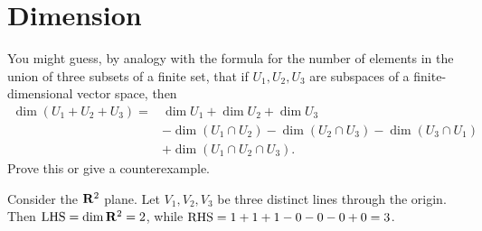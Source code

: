 \section{Dimension}

\begin{exercise}{17}
	You might guess, by analogy with the formula for the number of elements in the union of three subsets of a finite set, that if \( U_{1}, U_{2}, U_{3} \) are subspaces of a finite-dimensional vector space, then
	\begin{align*}
		\dim(U_{1} + U_{2} + U_{3}) =& \dim{U_{1}} + \dim{U_{2}} + \dim{U_{3}} \\
		                             &- \dim(U_{1} \cap U_{2}) - \dim(U_{2} \cap U_{3}) - \dim(U_{3} \cap U_{1}) \\
																 &+ \dim(U_{1} \cap U_{2} \cap U_{3}).
	\end{align*}
	Prove this or give a counterexample.
\end{exercise}

\begin{countexam}
	Consider the \( \mathbf{R}^{2} \) plane. Let \( V_{1}, V_{2}, V_{3} \) be three distinct lines through the origin. Then \( \mathrm{LHS} = \dim{\mathbf{R}^{2}} = 2 \), while \( \mathrm{RHS} = 1 + 1 + 1 - 0 - 0 - 0 + 0 = 3 \).
\end{countexam}
